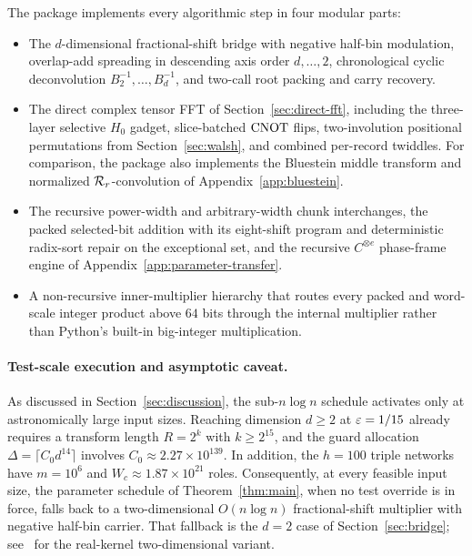 The package implements every algorithmic step in four modular parts:
\begin{itemize}[leftmargin=*,itemsep=2pt]
\item The $d$-dimensional fractional-shift bridge with negative half-bin modulation, overlap-add spreading in descending axis order $d,\dots,2$, chronological cyclic deconvolution $B_2^{-1},\dots,B_d^{-1}$, and two-call root packing and carry recovery.

\item The direct complex tensor FFT of Section~\ref{sec:direct-fft}, including the three-layer selective $H_0$ gadget, slice-batched $\mathrm{CNOT}$ flips, two-involution positional permutations from Section~\ref{sec:walsh}, and combined per-record twiddles. For comparison, the package also implements the Bluestein middle transform and normalized $\mathcal{R}_r$-convolution of Appendix~\ref{app:bluestein}.

\item The recursive power-width and arbitrary-width chunk interchanges, the packed selected-bit addition with its eight-shift program and deterministic radix-sort repair on the exceptional set, and the recursive $C^{\otimes e}$ phase-frame engine of Appendix~\ref{app:parameter-transfer}.

\item A non-recursive inner-multiplier hierarchy that routes every packed and word-scale integer product above $64$ bits through the internal multiplier rather than Python's built-in big-integer multiplication.
\end{itemize}

\paragraph{Test-scale execution and asymptotic caveat.}
As discussed in Section~\ref{sec:discussion}, the sub-$n\log n$ schedule activates only at astronomically large input sizes. Reaching dimension $d\ge2$ at $\varepsilon=1/15$ already requires a transform length $R=2^k$ with $k\ge2^{15}$, and the guard allocation $\Delta=\lceil C_0d^{14}\rceil$ involves $C_0\approx2.27\times10^{139}$. In addition, the $h=100$ triple networks have $m=10^6$ and $W_c\approx1.87\times10^{21}$ roles. Consequently, at every feasible input size, the parameter schedule of Theorem~\ref{thm:main}, when no test override is in force, falls back to a two-dimensional $O(n\log n)$ fractional-shift multiplier with negative half-bin carrier. That fallback is the $d=2$ case of Section~\ref{sec:bridge}; see~\cite{MS} for the real-kernel two-dimensional variant.

